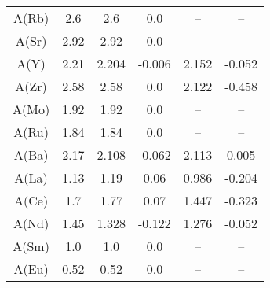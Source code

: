\begin{table}[ht]
\begin{tabular}{cccccc}
A(Rb) & 2.6 & 2.6 & 0.0 & -- & -- \\
A(Sr) & 2.92 & 2.92 & 0.0 & -- & -- \\
A(Y) & 2.21 & 2.204 & -0.006 & 2.152 & -0.052 \\
A(Zr) & 2.58 & 2.58 & 0.0 & 2.122 & -0.458 \\
A(Mo) & 1.92 & 1.92 & 0.0 & -- & -- \\
A(Ru) & 1.84 & 1.84 & 0.0 & -- & -- \\
A(Ba) & 2.17 & 2.108 & -0.062 & 2.113 & 0.005 \\
A(La) & 1.13 & 1.19 & 0.06 & 0.986 & -0.204 \\
A(Ce) & 1.7 & 1.77 & 0.07 & 1.447 & -0.323 \\
A(Nd) & 1.45 & 1.328 & -0.122 & 1.276 & -0.052 \\
A(Sm) & 1.0 & 1.0 & 0.0 & -- & -- \\
A(Eu) & 0.52 & 0.52 & 0.0 & -- & -- \\
\hline
\end{tabular}
\end{table}